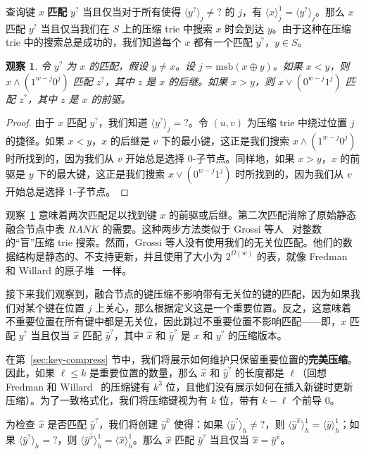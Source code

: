 \documentclass[11pt,a4paper]{ctexart}
\newcommand{\tto}{\text{0}}
\newcommand{\ttl}{\text{1}}
\newcommand{\ttq}{\text{?}}
\newcommand{\lpiece}[3]{\langle #1 \rangle_{#2}^{#3}}
\newcommand{\lpieceq}[2]{\langle #1 \rangle_{#2}}
\newcommand{\AND}{\land}
\newcommand{\OR}{\lor}
\newcommand{\XOR}{\oplus}
\newcommand{\MSB}{\text{msb}}
\newtheorem{observation}[lemma]{观察}
\begin{document}
查询键 $x$ \textbf{匹配} $y^{\ttq}$ 当且仅当对于所有使得 $\lpieceq{y^{\ttq}}{j} \neq \ttq$ 的 $j$，有 $\lpiece{x}{j}{1} = \lpieceq{y^{\ttq}}{j}$。那么 $x$ 匹配 $y^{\ttq}$ 当且仅当我们在 $S$ 上的压缩 trie 中搜索 $x$ 时会到达 $y$。由于这种在压缩 trie 中的搜索总是成功的，我们知道每个 $x$ 都有一个匹配 $y^{\ttq}$，$y \in S$。

\begin{observation}\label{obs:trie-search}
令 $y^{\ttq}$ 为 $x$ 的匹配，假设 $y \neq x$。设 $j = \MSB(x \XOR y)$。如果 $x < y$，则 $x \AND (\ttl^{w-j}\tto^j)$ 匹配 $z^{\ttq}$，其中 $z$ 是 $x$ 的后继。如果 $x > y$，则 $x \OR (\tto^{w-j}\ttl^j)$ 匹配 $z^{\ttq}$，其中 $z$ 是 $x$ 的前驱。
\end{observation}
\begin{proof}
由于 $x$ 匹配 $y^{\ttq}$，我们知道 $\lpieceq{y^{\ttq}}{j} = \ttq$。令 $(u, v)$ 为压缩 trie 中绕过位置 $j$ 的捷径。如果 $x < y$，$x$ 的后继是 $v$ 下的最小键，这正是我们搜索 $x \AND (\ttl^{w-j}\tto^j)$ 时所找到的，因为我们从 $v$ 开始总是选择 $\tto$-子节点。同样地，如果 $x > y$，$x$ 的前驱是 $y$ 下的最大键，这正是我们搜索 $x \OR (\tto^{w-j}\ttl^j)$ 时所找到的，因为我们从 $v$ 开始总是选择 $\ttl$-子节点。
\end{proof}

观察~\ref{obs:trie-search} 意味着两次匹配足以找到键 $x$ 的前驱或后继。第二次匹配消除了原始静态融合节点中表 $RANK$ 的需要。这种两步方法类似于 Grossi 等人~\cite{grossi09succinct} 对整数的``盲''压缩 trie 搜索。然而，Grossi 等人没有使用我们的无关位匹配。他们的数据结构是静态的、不支持更新，并且使用了大小为 $2^{\Omega(w)}$ 的表，就像 Fredman 和 Willard 的原子堆~\cite{fredman94atomic} 一样。

接下来我们观察到，融合节点的键压缩不影响带有无关位的键的匹配，因为如果我们对某个键在位置 $j$ 上关心，那么根据定义这是一个重要位置。反之，这意味着不重要位置在所有键中都是无关位，因此跳过不重要位置不影响匹配——即，$x$ 匹配 $y^{\ttq}$ 当且仅当 $\hat{x}$ 匹配 $\hat{y}^{\ttq}$，其中 $\hat{x}$ 和 $\hat{y}^{\ttq}$ 是 $x$ 和 $y^{\ttq}$ 的压缩版本。

在第~\ref{sec:key-compress} 节中，我们将展示如何维护只保留重要位置的\textbf{完美压缩}。因此，如果 $\ell \leq k$ 是重要位置的数量，那么 $\hat{x}$ 和 $\hat{y}^{\ttq}$ 的长度都是 $\ell$（回想 Fredman 和 Willard~\cite{fredman93fusion} 的压缩键有 $k^3$ 位，且他们没有展示如何在插入新键时更新压缩）。为了一致格式化，我们将压缩键视为有 $k$ 位，带有 $k-\ell$ 个前导 $\tto$。

为检查 $\hat{x}$ 是否匹配 $\hat{y}^{\ttq}$，我们将创建 $\hat{y}^{\hat{x}}$ 使得：如果 $\lpieceq{\hat{y}^{\ttq}}{h} \neq \ttq$，则 $\lpiece{\hat{y}^{\hat{x}}}{h}{1} = \lpiece{\hat{y}}{h}{1}$；如果 $\lpieceq{\hat{y}^{\ttq}}{h} = \ttq$，则 $\lpiece{\hat{y}^{\hat{x}}}{h}{1} = \lpiece{\hat{x}}{h}{1}$。那么 $\hat{x}$ 匹配 $\hat{y}^{\ttq}$ 当且仅当 $\hat{x} = \hat{y}^{\hat{x}}$。
\end{document}
